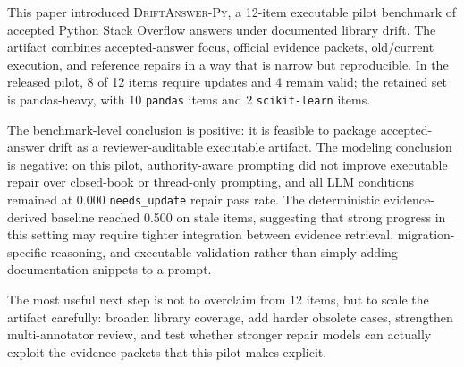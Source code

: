 \documentclass{article}
\newcommand{\dataset}{\textsc{DriftAnswer-Py}}
\newcommand{\needsupdate}{\texttt{needs\_update}}
\begin{document}
This paper introduced \dataset, a 12-item executable pilot benchmark of accepted Python Stack Overflow answers under documented library drift. The artifact combines accepted-answer focus, official evidence packets, old/current execution, and reference repairs in a way that is narrow but reproducible. In the released pilot, 8 of 12 items require updates and 4 remain valid; the retained set is pandas-heavy, with 10 \texttt{pandas} items and 2 \texttt{scikit-learn} items.

The benchmark-level conclusion is positive: it is feasible to package accepted-answer drift as a reviewer-auditable executable artifact. The modeling conclusion is negative: on this pilot, authority-aware prompting did not improve executable repair over closed-book or thread-only prompting, and all LLM conditions remained at 0.000 \needsupdate{} repair pass rate. The deterministic evidence-derived baseline reached 0.500 on stale items, suggesting that strong progress in this setting may require tighter integration between evidence retrieval, migration-specific reasoning, and executable validation rather than simply adding documentation snippets to a prompt.

The most useful next step is not to overclaim from 12 items, but to scale the artifact carefully: broaden library coverage, add harder obsolete cases, strengthen multi-annotator review, and test whether stronger repair models can actually exploit the evidence packets that this pilot makes explicit.
\end{document}
